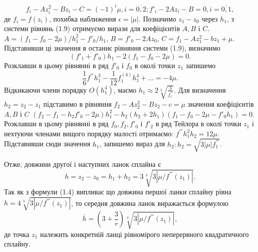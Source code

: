 \documentclass[ukrainian,14pt]{extarticle}
\begin{document}
$$f_i - Az^2_i - Bz_i - C = (-1)^i \mu, i = \overline{0,2}; f'_i - 2Az_i - B = 0, i = \overline{0, 1},$$де $f_i = f(z_i)$, похибка наближення $\epsilon = |\mu|$. Позначимо $z_1 - z_0$ через $h_1$, з системи рівнянь (1.9) отримуємо вирази для коефіцієнтів $A, B$ і $C$. $A = (f_1 - f_0 - 2\mu) / h_1^2 - f'_0 / h_1$, $B=f'_0 - 2Az_0$, $C = f_1 - Az_1^2 - bz_1 + \mu$. Підставивши ці значення в останнє рівняння системи (1.9), визначимо
$$(f'_1 + f'_0) h_1 - 2(f_1 - f_0 -2\mu) = 0.$$
Розклавши в цьому рівнянні в ряд $f'_0$ і $f_0$ в околі точки $z_1$ запишемо
$$\frac{1}{6}f^{'''}h^3_1 - \frac{1}{12} f_1^{(4)}h_1^4 + \ldots = -4\mu.$$
Відкикаючи члени порядку $O(h_1^4)$, маємо $h_1 \approx 2 \sqrt[3]{\frac{3}{f^{'''}_1}}$. Для визначення $h_2 = z_2 - z_1$ підставимо в рівняння $f_2 - Az_2^2 - Bz_2 - c = \mu$ значення коефіцієнтів $A, B$ і $C$
$(f_2 - f_1 - h_2 f'_0 - 2\mu) h_1^2 - h_2(h_2 + 2h_1)(f_1 - f_0 - 2\mu - f'_0h_1) = 0.$
Розклавши в цьому рівнянні в ряд $f_0, f_2, f'_0$ і $f'_2$ в ряд Тейлора в околі точки $z_1$ і нехтуючи членами вищого порядку малості отримаємо: $f^{'''}h^2_1 h_2 = 12\mu$. Підставивши сюди значення $h_1$, запишемо вираз для $h_2: h_2 = \sqrt{3 |\mu| f^{'''}_1}$.

Отже, довжини другої і наступних ланок сплайна є
$$h = z_2 - z_0 = h_1 + h_2 = 3 \sqrt[3]{3 |\mu / f^{'''}(z_1)|}.$$ Так як з формули (1.4) випливає що довжина першої ланки сплайну рівна $h = 4\sqrt[3]{3 |\mu / f^{'''}(z_1)|}$, то середня довжина ланок виражається формулою
$$\bar{h} = \left(3 + \frac{3}{r}\right) \sqrt[3]{3 |\mu / f^{'''}(z_1)|}, $$ де точка $z_1$ належить конкретній ланці рівномірого неперервного квадратичного сплайну.




\end{document}
